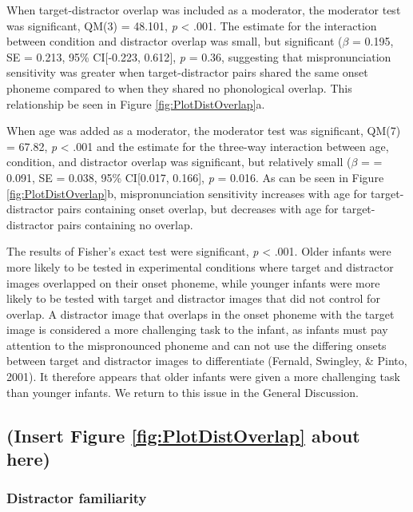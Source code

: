 \documentclass[man]{apa6}
\begin{document}
When target-distractor overlap was included as a moderator, the moderator test was significant, QM(3) = 48.101, \emph{p} \textless{} .001. The estimate for the interaction between condition and distractor overlap was small, but significant (\(\beta\) = 0.195, SE = 0.213, 95\% CI{[}-0.223, 0.612{]}, \emph{p} = 0.36, suggesting that mispronunciation sensitivity was greater when target-distractor pairs shared the same onset phoneme compared to when they shared no phonological overlap. This relationship be seen in Figure \ref{fig:PlotDistOverlap}a.

When age was added as a moderator, the moderator test was significant, QM(7) = 67.82, \emph{p} \textless{} .001 and the estimate for the three-way interaction between age, condition, and distractor overlap was significant, but relatively small (\(\beta\) = = 0.091, SE = 0.038, 95\% CI{[}0.017, 0.166{]}, \emph{p} = 0.016. As can be seen in Figure \ref{fig:PlotDistOverlap}b, mispronunciation sensitivity increases with age for target-distractor pairs containing onset overlap, but decreases with age for target-distractor pairs containing no overlap.

The results of Fisher's exact test were significant, \emph{p} \textless{} .001. Older infants were more likely to be tested in experimental conditions where target and distractor images overlapped on their onset phoneme, while younger infants were more likely to be tested with target and distractor images that did not control for overlap. A distractor image that overlaps in the onset phoneme with the target image is considered a more challenging task to the infant, as infants must pay attention to the mispronounced phoneme and can not use the differing onsets between target and distractor images to differentiate (Fernald, Swingley, \& Pinto, 2001). It therefore appears that older infants were given a more challenging task than younger infants. We return to this issue in the General Discussion.

\hypertarget{insert-figure-reffigplotdistoverlap-about-here}{%
\subsection{(Insert Figure \ref{fig:PlotDistOverlap} about here)}\label{insert-figure-reffigplotdistoverlap-about-here}}

\hypertarget{distractor-familiarity}{%
\subsubsection{Distractor familiarity}\label{distractor-familiarity}}
\end{document}
